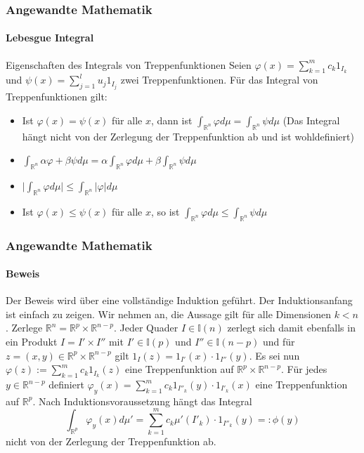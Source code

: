 \documentclass{beamer}
\begin{document}
\begin{frame}
    \frametitle{Angewandte Mathematik}
\framesubtitle{Lebesgue Integral}
    \begin{block}{Eigenschaften des Integrals von Treppenfunktionen}
Seien $\varphi(x) =   \sum_{k=1}^m  c_k 1_{I_k}$ und $\psi(x) =  \sum_{j=1}^l  u_j 1_{I_j}$ zwei Treppenfunktionen.
Für das Integral von Treppenfunktionen gilt:
\begin{itemize}
\item Ist $\varphi(x) = \psi(x)$ für alle $x$, dann ist $\int_{\mathbb{R}^n} \varphi d\mu = \int_{\mathbb{R}^n} \psi d\mu$ (Das Integral hängt nicht von der Zerlegung der Treppenfunktion ab und  ist wohldefiniert)
\item $\int_{\mathbb{R}^n} \alpha \varphi  + \beta \psi d\mu = \alpha \int_{\mathbb{R}^n}  \varphi d\mu + \beta  \int_{\mathbb{R}^n}  \psi d\mu$
\item $ \biggl|  \int_{\mathbb{R}^n} \varphi d\mu  \biggr| \leq \int_{\mathbb{R}^n} | \varphi | d\mu$
\item Ist $\varphi(x) \leq \psi(x)$ für alle $x$, so ist $\int_{\mathbb{R}^n} \varphi d\mu \leq \int_{\mathbb{R}^n} \psi d\mu$ 
\end{itemize}
\end{block}

 \end{frame}


\begin{frame}
    \frametitle{Angewandte Mathematik}
\framesubtitle{Beweis}

Der Beweis wird über eine vollständige Induktion geführt. Der Induktionsanfang ist einfach zu zeigen. 
Wir nehmen an, die Aussage gilt für alle Dimensionen $k < n$.
Zerlege $\mathbb{R}^n = \mathbb{R}^p \times \mathbb{R}^{n-p}$. Jeder Quader $I \in \mathbb{I}(n)$ zerlegt sich damit ebenfalls in ein Produkt 
$I = I' \times I''$ mit $I'  \in \mathbb{I}(p)$ und  $I''  \in \mathbb{I}(n-p)$ und für $z = (x,y) \in  \mathbb{R}^p \times \mathbb{R}^{n-p}$ gilt $1_{I} (z) = 1_{I'}(x) \cdot 1_{I''}(y)$. Es sei nun $\varphi(z):=   \sum_{k=1}^m  c_k 1_{I_k}(z)$ eine Treppenfunktion auf $ \mathbb{R}^p \times \mathbb{R}^{n-p}$. Für jedes $y \in \mathbb{R}^{n-p}$ definiert  $\varphi_y(x)=   \sum_{k=1}^m  c_k 1_{I''_k}(y) \cdot 1_{I'_k}(x)$ eine Treppenfunktion auf $\mathbb{R}^{p}$. 
Nach Induktionsvoraussetzung hängt das Integral 
$$\int_{\mathbb{R}^p}  \varphi_y(x) d \mu' = \sum_{k=1}^m  c_k \mu'(I'_k)  \cdot 1_{I''_k}(y)  =: \phi(y)$$
nicht von der Zerlegung der Treppenfunktion ab.  \end{frame}
\end{document}
